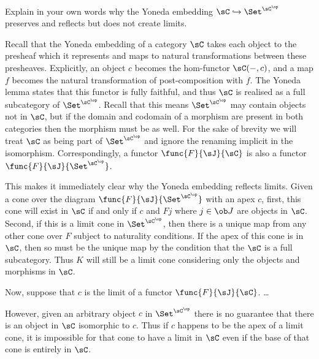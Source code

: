 \documentclass[../../main]{subfiles}
\begin{document}
\paragraph{}
\begin{exercise}
	Explain in your own words why the Yoneda embedding
	\({\sC}\hookrightarrow{\Set^{\sC^\op}}\) preserves and reflects but does not
	create limits.
\end{exercise}

Recall that the Yoneda embedding of a category \(\sC\) takes each object to the
presheaf which it represents and maps to natural transformations between these
presheaves. Explicitly, an object \(c\) becomes the hom-functor \(\sC(-,c)\),
and a map \(f\) becomes the natural transformation of post-composition with
\(f\). The Yoneda lemma states that this functor is fully faithful, and thus
\(\sC\) is realised as a full subcategory of \(\Set^{\sC^\op}\). Recall that
this means \(\Set^{\sC^\op}\) may contain objects not in \(\sC\), but if the
domain and codomain of a morphism are present in both categories then the
morphism must be as well. For the sake of brevity we will treat \(\sC\) as being
part of \(\Set^{\sC^\op}\) and ignore the renaming implicit in the isomorphism.
Correspondingly, a functor \(\func{F}{\sJ}{\sC}\) is also a functor
\(\func{F}{\sJ}{\Set^{\sC^\op}}\).

This makes it immediately clear why the Yoneda embedding reflects limits. Given
a cone over the diagram \(\func{F}{\sJ}{\Set^{\sC^\op}}\) with an apex
\(c\), first, this cone will exist in \(\sC\) if and only if \(c\) and \(Fj\)
where \(j\in\ob J\) are objects in \(\sC\). Second, if this is a limit cone in
\(\Set^{\sC^\op}\), then there is a unique map from any other cone over \(F\)
subject to naturality conditions. If the apex of this cone is in \(\sC\), then
so must be the unique map by the condition that the \(\sC\) is a full
subcategory. Thus \(K\) will still be a limit cone considering only the objects
and morphisms in \(\sC\).

Now, suppose that \(c\) is the limit of a functor \(\func{F}{\sJ}{\sC}\). \dots

However, given an arbitrary object \(c\) in \(\Set^{\sC^\op}\) there is no
guarantee that there is an object in \(\sC\) isomorphic to \(c\). Thus if \(c\)
happens to be the apex of a limit cone, it is impossible for that cone to have a
limit in \(\sC\) even if the base of that cone is entirely in \(\sC\).
\end{document}
